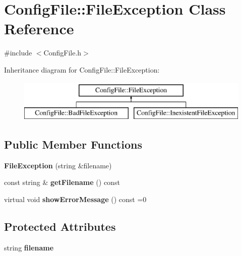 \hypertarget{class_config_file_1_1_file_exception}{}\section{Config\+File\+:\+:File\+Exception Class Reference}
\label{class_config_file_1_1_file_exception}


{\ttfamily \#include $<$Config\+File.\+h$>$}

Inheritance diagram for Config\+File\+:\+:File\+Exception\+:\begin{figure}[H]
\begin{center}
\leavevmode
\includegraphics[height=2.000000cm]{class_config_file_1_1_file_exception}
\end{center}
\end{figure}
\subsection*{Public Member Functions}
\begin{DoxyCompactItemize}
\item 
\hypertarget{class_config_file_1_1_file_exception_ac0ef1dc6fab3adf968f4840659a7fd6e}{}{\bfseries File\+Exception} (string \&filename)\label{class_config_file_1_1_file_exception_ac0ef1dc6fab3adf968f4840659a7fd6e}

\item 
\hypertarget{class_config_file_1_1_file_exception_aec049b6e0245146d52f0feba60ccd12c}{}const string \& {\bfseries get\+Filename} () const \label{class_config_file_1_1_file_exception_aec049b6e0245146d52f0feba60ccd12c}

\item 
\hypertarget{class_config_file_1_1_file_exception_abda277ef553415617acf0253594af189}{}virtual void {\bfseries show\+Error\+Message} () const  =0\label{class_config_file_1_1_file_exception_abda277ef553415617acf0253594af189}

\end{DoxyCompactItemize}
\subsection*{Protected Attributes}
\begin{DoxyCompactItemize}
\item 
\hypertarget{class_config_file_1_1_file_exception_a1f1eda91b120d28cbeee5e0a5856a3f7}{}string {\bfseries filename}\label{class_config_file_1_1_file_exception_a1f1eda91b120d28cbeee5e0a5856a3f7}

\end{DoxyCompactItemize}


